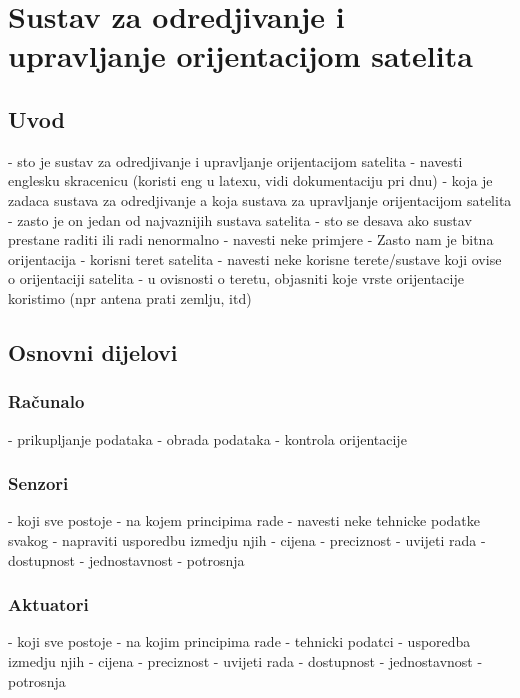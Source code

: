 \documentclass[times, utf8, diplomski, numeric]{templates/template}
\begin{document}
\chapter{Sustav za odredjivanje i upravljanje orijentacijom satelita}{
    \section{Uvod}{
        - sto je sustav za odredjivanje i upravljanje orijentacijom satelita
            - navesti englesku skracenicu (koristi eng u latexu, vidi dokumentaciju pri dnu)
        - koja je zadaca sustava za odredjivanje a koja sustava za upravljanje orijentacijom satelita
        - zasto je on jedan od najvaznijih sustava satelita
            - sto se desava ako sustav prestane raditi ili radi nenormalno
                - navesti neke primjere
        - Zasto nam je bitna orijentacija
            - korisni teret satelita
                - navesti neke korisne terete/sustave koji ovise o orijentaciji satelita
                - u ovisnosti o teretu, objasniti koje vrste orijentacije koristimo (npr antena prati zemlju, itd)
    }

    \section{Osnovni dijelovi}{
        \subsection{Računalo}{
            - prikupljanje podataka
            - obrada podataka
            - kontrola orijentacije
        }

        \subsection{Senzori}{
            - koji sve postoje
            - na kojem principima rade
            - navesti neke tehnicke podatke svakog
            - napraviti usporedbu izmedju njih
                - cijena
                - preciznost
                - uvijeti rada
                - dostupnost
                - jednostavnost
                - potrosnja
        }

        \subsection{Aktuatori}{
            - koji sve postoje
            - na kojim principima rade
            - tehnicki podatci
            - usporedba izmedju njih
                - cijena
                - preciznost
                - uvijeti rada
                - dostupnost
                - jednostavnost
                - potrosnja
        }
    }

}
\end{document}
